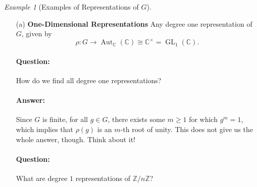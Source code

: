 \documentclass[a4paper]{report}
\theoremstyle{definition}
\theoremstyle{remark}
\theoremstyle{proposition}
\theoremstyle{conjecture}
\theoremstyle{lemma}
\theoremstyle{corollary}
\theoremstyle{exercise}
\theoremstyle{example}
\newtheorem{example}{Example}
\newcommand{\C}{\mathbb{C}}
\newcommand{\on}{\operatorname}
\begin{document}
\begin{example}[Examples of Representations of $G$]
    \leavevmode
    \begin{itemize}
        \item[(a)] \textbf{One-Dimensional Representations} Any degree one representation of $G$, given by 
            $$\rho : G \longrightarrow \on{Aut}_\C(\C) \cong \C^\times = \on{GL}_1(\C).$$
\paragraph{Question:} How do we find all degree one representations?
\paragraph{Answer:}
Since $G$ is finite, for all $g \in G$, there exists some $m \geq 1$ for which 
$g^m = 1$, which implies that $\rho(g)$ is an $m$-th root of unity. This does 
not give us the whole answer, though. Think about it!
\paragraph{Question:} What are degree $1$ representations of 
$\mathbb{Z}/n\mathbb{Z}$?

\end{itemize}
\end{example}
\end{document}
